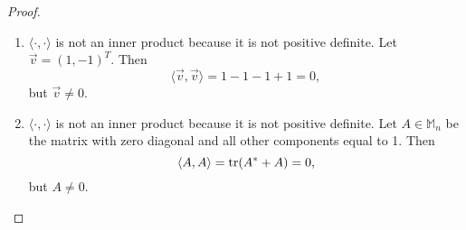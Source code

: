 \documentclass{homework}
\begin{document}
\begin{proof}
\begin{enumerate}
			\item $\langle \cdot, \cdot\rangle$ is not an inner product because it is not positive definite. Let $\vec{v} = (1,-1)^T$. Then
			\begin{equation*}
				\langle \vec{v}, \vec{v}\rangle = 1 -1 - 1 + 1 = 0,
			\end{equation*}
			but $\vec{v} \ne 0 $.
			
			\item $\langle \cdot, \cdot\rangle$ is not an inner product because it is not positive definite. Let $A \in \mathbb{M}_n$ be the matrix with zero diagonal and all other components equal to 1. Then
			\begin{equation*}
				\langle A, A\rangle = \mathrm{tr}(A^* + A) = 0,
			\end{equation*}
			but $A \ne 0$.
			

\end{enumerate}
\end{proof}
\end{document}
